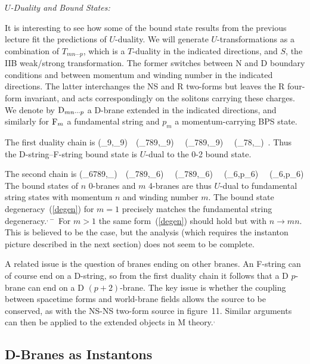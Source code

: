 {\it $U$-Duality and Bound States:}

It is interesting to see how some of the bound state results from the 
previous lecture fit the predictions of $U$-duality.  We will generate
$U$-transformations as a combination of $T_{mn\cdots p}$, which is a
$T$-duality in the indicated directions, and $S$, the IIB weak/strong
transformation.  The former switches between N and D boundary conditions and
between momentum and winding number in the indicated directions.  The latter
interchanges the NS and R two-forms but leaves the R four-form invariant, and
acts correspondingly on the solitons carrying these charges.  We denote by
${\rm D}_{mn\cdots p}$ a D-brane extended in the indicated directions, and
similarly for ${\rm F}_m$ a fundamental string and $p_m$ a momentum-carrying BPS
state.

The first duality chain is
\be
(\rD_9,\rF_9)\ \ (\rD_{789},\rF_9)
\ \ (\rD_{789},\rD_9)
\ \ (\rD_{78},\rD_{\emptyset})\ .
\ee
Thus the D-string--F-string bound state is $U$-dual to the 0-2 bound state.

The second chain is
\be
(\rD_{6789},\rD_{\emptyset})\ \ (\rD_{789},\rD_6)
\ \ (\rD_{789},\rF_6)
\ \ (\rD_{6},p_6)
\ \ (\rF_{6},p_6)
\ee
The bound states of $n$ 0-branes and $m$ 4-branes are thus $U$-dual to
fundamental string states with momentum $n$ and winding number $m$.  The
bound state degeneracy~(\ref{degen}) for $m=1$ precisely matches the
fundamental string
degeneracy.\cite{vafwit}$^{\!,\,}$\cite{senbound2}$^{\!-\,}$\cite{vafa2}
For $m>1$ the same form~(\ref{degen}) should hold but with $n \to mn$.  This
is believed to be the case, but the analysis (which requires the
instanton picture described in the next section) does not seem to be
complete.\cite{vafa2}

A related issue is the question of branes ending on other
branes.\cite{andyopen}  An F-string can of course end on a D-string, so from
the first duality chain it follows that a D $p$-brane can end on a D
$(p+2)$-brane.  The key issue is whether the coupling between
spacetime forms and world-brane fields allows the source to be conserved, as
with the NS-NS two-form source in figure~11.  Similar arguments can then be
applied to the extended objects in M
theory.\cite{andyopen}$^{\!,\,}$\cite{towndf}

\subsection{D-Branes as Instantons}

